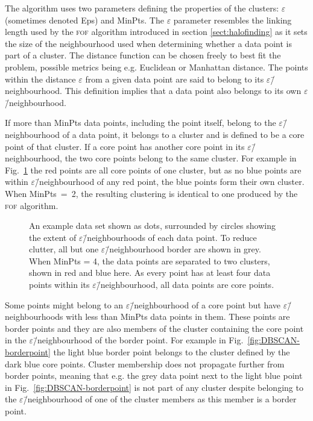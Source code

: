 \documentclass[english, twoside]{HYgradu}
\begin{document}
The algorithm uses two parameters defining the properties of the clusters: $\varepsilon$ (sometimes denoted Eps) and MinPts. The $\varepsilon$ parameter resembles the linking length used by the \textsc{fof} algorithm introduced in section \ref{sect:halofinding} as it sets the size of the neighbourhood used when determining whether a data point is part of a cluster. The distance function can be chosen freely to best fit the problem, possible metrics being e.g. Euclidean or Manhattan distance. The points within the distance $\varepsilon$ from a given data point are said to belong to its $\varepsilon$\=/neighbourhood. This definition implies that a data point also belongs to its own $\varepsilon$\=/neighbourhood.

If more than MinPts data points, including the point itself, belong to the $\varepsilon$\=/neighbourhood of a data point, it belongs to a cluster and is defined to be a core point of that cluster. If a core point has another core point in its $\varepsilon$\=/neighbourhood, the two core points belong to the same cluster. For example in Fig.\ \ref{fig:DBSCAN-twocores} the red points are all core points of one cluster, but as no blue points are within $\varepsilon$\=/neighbourhood of any red point, the blue points form their own cluster. When MinPts~=~2, the resulting clustering is identical to one produced by the \textsc{fof} algorithm.

\begin{figure}
    \centering
    
    \caption{An example data set shown as dots, surrounded by circles showing the extent of $\varepsilon$\=/neighbourhoods of each data point. To reduce clutter, all but one $\varepsilon$\=/neighbourhood border are shown in grey. When MinPts = 4, the data points are separated to two clusters, shown in red and blue here. As every point has at least four data points within its $\varepsilon$\=/neighbourhood, all data points are core points.}\label{fig:DBSCAN-twocores}
\end{figure}

Some points might belong to an $\varepsilon$\=/neighbourhood of a core point but have $\varepsilon$\=/neighbourhoods with less than MinPts data points in them. These points are border points and they are also members of the cluster containing the core point in the $\varepsilon$\=/neighbourhood of the border point. For example in Fig.\ \ref{fig:DBSCAN-borderpoint} the light blue border point belongs to the cluster defined by the dark blue core points. Cluster membership does not propagate further from border points, meaning that e.g. the grey data point next to the light blue point in Fig.\ \ref{fig:DBSCAN-borderpoint} is not part of any cluster despite belonging to the $\varepsilon$\=/neighbourhood of one of the cluster members as this member is a border point.
\end{document}
